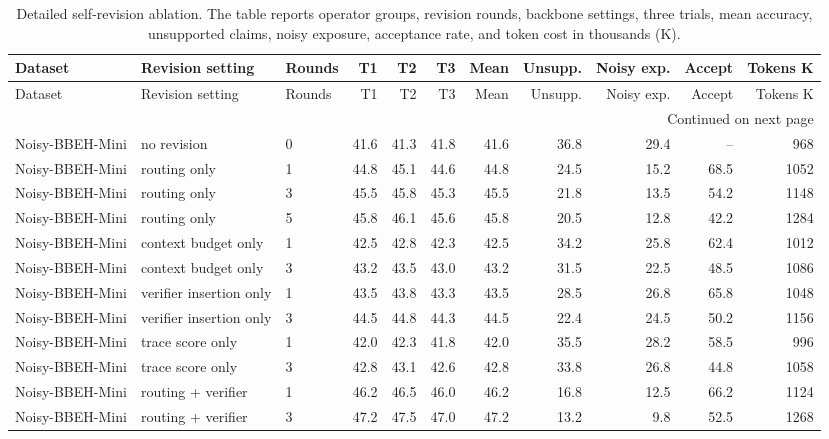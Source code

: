 ﻿\begingroup
\scriptsize
\setlength{\tabcolsep}{2.3pt}
\setlength{\LTleft}{\fill}
\setlength{\LTright}{\fill}
\begin{longtable}{lllrrrrrrrr}
\caption{Detailed self-revision ablation. The table reports operator groups, revision rounds, backbone settings, three trials, mean accuracy, unsupported claims, noisy exposure, acceptance rate, and token cost in thousands (K).}\label{tab:self-revision-detailed}\\
\toprule
Dataset & Revision setting & Rounds & T1 & T2 & T3 & Mean & Unsupp. & Noisy exp. & Accept & Tokens K \\
\midrule
\endfirsthead
\toprule
Dataset & Revision setting & Rounds & T1 & T2 & T3 & Mean & Unsupp. & Noisy exp. & Accept & Tokens K \\
\midrule
\endhead
\midrule
\multicolumn{11}{r}{\scriptsize Continued on next page}\\
\endfoot
\bottomrule
\endlastfoot
Noisy-BBEH-Mini & no revision & 0 & 41.6 & 41.3 & 41.8 & 41.6 & 36.8 & 29.4 & -- & 968 \\
Noisy-BBEH-Mini & routing only & 1 & 44.8 & 45.1 & 44.6 & 44.8 & 24.5 & 15.2 & 68.5 & 1052 \\
Noisy-BBEH-Mini & routing only & 3 & 45.5 & 45.8 & 45.3 & 45.5 & 21.8 & 13.5 & 54.2 & 1148 \\
Noisy-BBEH-Mini & routing only & 5 & 45.8 & 46.1 & 45.6 & 45.8 & 20.5 & 12.8 & 42.2 & 1284 \\
Noisy-BBEH-Mini & context budget only & 1 & 42.5 & 42.8 & 42.3 & 42.5 & 34.2 & 25.8 & 62.4 & 1012 \\
Noisy-BBEH-Mini & context budget only & 3 & 43.2 & 43.5 & 43.0 & 43.2 & 31.5 & 22.5 & 48.5 & 1086 \\
Noisy-BBEH-Mini & verifier insertion only & 1 & 43.5 & 43.8 & 43.3 & 43.5 & 28.5 & 26.8 & 65.8 & 1048 \\
Noisy-BBEH-Mini & verifier insertion only & 3 & 44.5 & 44.8 & 44.3 & 44.5 & 22.4 & 24.5 & 50.2 & 1156 \\
Noisy-BBEH-Mini & trace score only & 1 & 42.0 & 42.3 & 41.8 & 42.0 & 35.5 & 28.2 & 58.5 & 996 \\
Noisy-BBEH-Mini & trace score only & 3 & 42.8 & 43.1 & 42.6 & 42.8 & 33.8 & 26.8 & 44.8 & 1058 \\
Noisy-BBEH-Mini & routing + verifier & 1 & 46.2 & 46.5 & 46.0 & 46.2 & 16.8 & 12.5 & 66.2 & 1124 \\
Noisy-BBEH-Mini & routing + verifier & 3 & 47.2 & 47.5 & 47.0 & 47.2 & 13.2 & 9.8 & 52.5 & 1268 \\

\end{longtable}
